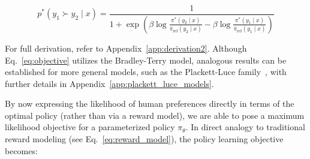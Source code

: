 \begin{equation}\label{eq:objective}
    p^*(y_1\succ y_2 \mid x)=\frac{1}{1 + \exp\left(\beta \log \frac{\pi^*(y_2\mid x)}{\pi_\text{ref}(y_2\mid x)} - \beta \log \frac{\pi^*(y_1\mid x)}{\pi_\text{ref}(y_1\mid x)}\right)}
\end{equation}

For full derivation, refer to Appendix~\ref{app:derivation2}. Although Eq.~\ref{eq:objective} utilizes the Bradley-Terry model, analogous results can be established for more general models, such as the Plackett-Luce family~\citep{plackett1975analysis, luce2012individual}, with further details in Appendix~\ref{app:plackett_luce_models}.

By now expressing the likelihood of human preferences directly in terms of the optimal policy (rather than via a reward model), we are able to pose a maximum likelihood objective for a parameterized policy $\pi_\theta$. In direct analogy to traditional reward modeling (see Eq.~\ref{eq:reward_model}), the policy learning objective becomes:

